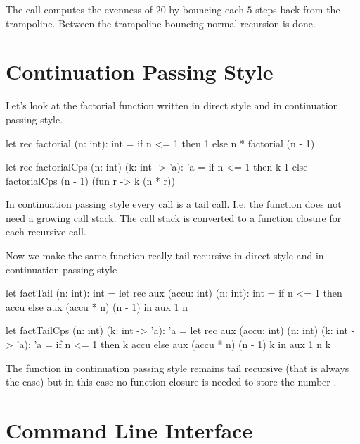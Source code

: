 The call  computes the evenness of $20$ by bouncing each
$5$ steps back from the trampoline. Between the trampoline bouncing normal
recursion is done.





\section{Continuation Passing Style}

Let's look at the factorial function written in direct style and in continuation
passing style.

\begin{ocaml}
    let rec factorial (n: int): int =
        if n <= 1 then
            1
        else
            n * factorial (n - 1)

    let rec factorialCps (n: int) (k: int -> 'a): 'a =
        if n <= 1 then
            k 1
        else
            factorialCps
                    (n - 1)
                    (fun r ->
                         k (n * r))
\end{ocaml}

In continuation passing style every call is a tail call. I.e. the function does
not need a growing call stack. The call stack is converted to a function closure
for each recursive call.

Now we make the same function really tail recursive in direct style and in
continuation passing style

\begin{ocaml}
let factTail (n: int): int =
    let rec aux (accu: int) (n: int): int =
        if n <= 1 then
            accu
        else
            aux (accu * n) (n - 1)
    in
    aux 1 n

let factTailCps (n: int) (k: int -> 'a): 'a =
    let rec aux (accu: int) (n: int) (k: int -> 'a): 'a =
        if n <= 1 then
            k accu
        else
            aux (accu * n) (n - 1) k
    in
    aux 1 n k
\end{ocaml}

The function in continuation passing style remains tail recursive (that is
always the case) but in this case no function closure is needed to store the
number .





\section{Command Line Interface}

